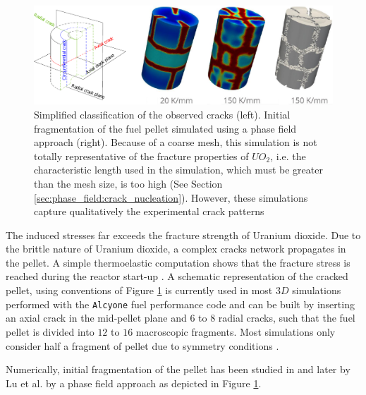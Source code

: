 \begin{figure}[H]
  \centering
  \includegraphics[width=10.cm]{../chapter_000_introduction/figures/CrackNetwork.pdf}
  \caption{Simplified classification of the observed cracks (left). Initial
  fragmentation of the fuel pellet simulated using a phase field approach
  \cite{2019_LU_HELFER_BARY_FANDEUR_UnSchemaNumeriqueEfficacePourLeTraitementDeLaFissurationFragileDesMateriauxQuasiFragilesParChampDePhase} (right). Because of a coarse mesh, this
  simulation is not totally representative of the fracture properties of
  \(UO_{2}\), i.e. the characteristic length used in the simulation, which
  must be greater than the mesh size, is too high (See Section
  \ref{sec:phase_field:crack_nucleation}). However, these simulations capture
  qualitatively the experimental crack patterns}
  \label{fig:hho:crack_network}
\end{figure}

The induced stresses far exceeds the fracture strength of Uranium
dioxide. Due to the brittle nature of Uranium dioxide, a complex cracks
network propagates in the pellet. A simple thermoelastic computation
shows that the fracture stress is reached during the reactor start-up
\cite{helfer_etude_2006}. A schematic representation of the cracked pellet,
using conventions of Figure \ref{fig:hho:crack_network} is currently used in
most \(3D\) simulations performed with the \texttt{Alcyone} fuel performance
code and can be built by inserting an axial crack in the mid-pellet
plane and \(6\) to \(8\) radial cracks, such that the fuel pellet is
divided into \(12\) to \(16\) macroscopic fragments. Most simulations
only consider half a fragment of pellet due to symmetry conditions
\cite{michel_pellet_2005}.

Numerically, initial fragmentation of the pellet has been studied in
\cite{helfer_modelisation_2017} and later by Lu et al. \cite{2019_LU_HELFER_BARY_FANDEUR_UnSchemaNumeriqueEfficacePourLeTraitementDeLaFissurationFragileDesMateriauxQuasiFragilesParChampDePhase} by a
phase field approach as depicted in Figure
\ref{fig:hho:crack_network}.


